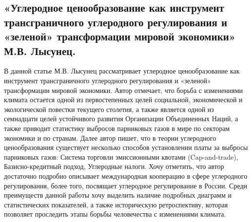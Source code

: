 \documentclass[a4paper,14pt]{article}
\begin{document}
\subsection{«Углеродное ценообразование как инструмент трансграничного углеродного регулирования и «зеленой» трансформации мировой экономики»  М.В. Лысунец.}
В данной статье М.В. Лысунец рассматривает углеродное ценообразование как инструмент трансграничного углеродного регулирования и «зеленой» трансформации мировой экономики. Автор отмечает, что борьба с изменениями климата остается одной из первостепенных целей социальной, экономической и экологической повестки текущего столетия, а также является одной из семнадцати целей устойчивого развития Организации Объединенных Наций, а также приводит статистику выбросов парниковых газов в мире по секторам экономики и по странам. Далее автор пишет, что в теории углеродного ценообразования существует несколько способов установлении платы за выбросы парниковых газов: Система торговли эмиссионными квотами (Cap-and-trade), Базисно-кредитный подход, Углеродные налоги. Хочу отметить, что автор достаточно подробно описывает международная кооперацию в сфере углеродного регулирования, более того, посвящает углеродное регулирование в России. Среди преимуществ данной работы хочу выделить наличие подробных диаграмм и статистических показателей, а также историческую ретроспективу, которая позволяет проследить этапы борьбы человечества с изменениями климата.
\end{document}
